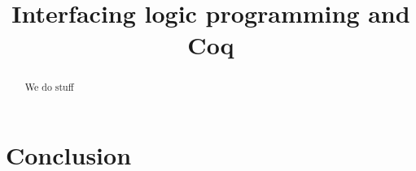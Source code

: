 \documentclass[a4paper,USenglish,cleveref, autoref, thm-restate]{lipics-v2019}
\title{Interfacing logic programming and Coq} %
\begin{document}
\maketitle

\begin{abstract}
We do stuff
\end{abstract}







\section{Conclusion}


\appendix

\end{document}
